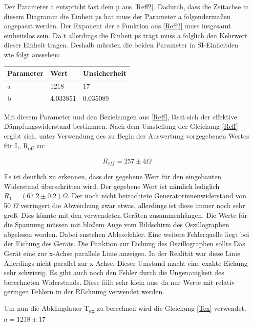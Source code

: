 \documentclass[titlepage=firstcover, captions=tableheading]{scrartcl}
\begin{document}
\noindent Der Parameter a entspricht fast dem µ aus \ref{Reff2}.
Dadurch, dass die Zeitachse in diesem Diagramm die Einheit µs hat muss der Parameter a folgendermaßen angepasst werden.
Der Exponent der e Funktion aus \ref{Reff2} muss insgesamt einheitslos sein.
Da t allerdings die Einheit µs trägt muss a folglich den Kehrwert dieser Einheit tragen.
Deshalb müssten die beiden Parameter in SI-Einheitden wie folgt aussehen:
\begin{center}
    \begin{tabular}{ll @{${}\pm{}$}l}
        \toprule
        Parameter & Wert & Unsicherheit\\
        \midrule
        a & 1218 & 17  \\
        b & 4.033851 & 0.035089  \\
    \end{tabular}
    \end{center}
Mit diesem Parameter und den Beziehungen aus \ref{Reff}, 
lässt sich der effektive Dämpfungswiderstand bestimmen.
Nach dem Umstellung der Gleichung \ref{Reff} ergibt sich,
unter Verwendung des zu Begin der Auswertung vorgegebenen Wertes für L,
R\textsubscript{eff} zu:

\begin{displaymath}
    R_{eff} = 257 \pm 4 \Omega
\end{displaymath}

\noindent Es ist deutlich zu erkennen, dass der gegebene Wert für den eingebauten Widerstand überschritten wird.
Der gegebene Wert ist nämlich lediglich $R_1 = (67.2 \pm 0.2) \Omega$.
Der noch nicht betrachtete Generatorinnenwiderstand von 50 $\Omega$ verringert die Abweichung zwar etwas, 
allerdings ist diese immer noch sehr groß.
Dies könnte mit den verwendeten Geräten zusammenhängen. 
Die Werte für die Spannung müssen mit bloßem Auge vom Bildschirm des Oszillographen abgelesen werden.
Dabei enstehen Ablesefehler.
Eine weitere Fehlerquelle liegt bei der Eichung des Geräts. 
Die Funktion zur Eichung des Oszillographen sollte Das Gerät eine zur x-Achse parallele Linie anzeigen.
In der Realität war diese Linie Allerdings nicht parallel zur x-Achse. 
Dieser Umstand macht eine exakte Eichung sehr schwierig.
Es gibt auch noch den Fehler durch die Ungenauigkeit des berechneten Widerstands.
Diese fällt sehr klein aus, da nur Werte mit relativ geringen Fehlern in der REchnung verwendet werden.

\noindent Um nun die Abklingdauer T\textsubscript{ex} zu berechnen wird die Gleichung \ref{Tex} verwendet.
$a = 1218 \pm 17$
\end{document}
